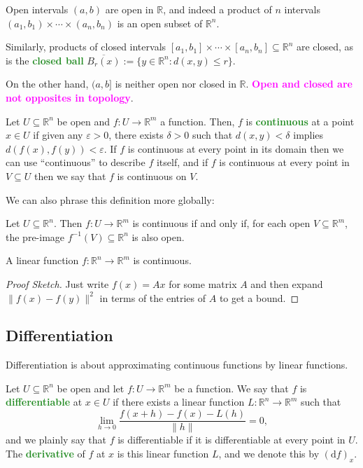 \documentclass[10pt]{scrartcl}
\providecommand{\ol}{\overline}
\providecommand{\eps}{\varepsilon}
\providecommand{\RR}{\mathbb R}
\providecommand{\alert}[1]{{\sffamily\textbf{\textcolor{magenta}{#1}}}}
\providecommand{\inv}{^{-1}}
\providecommand{\vocab}[1]{{\textbf{\textcolor{ForestGreen}{#1}}}}
\begin{document}
\begin{example}
	Open intervals $(a,b)$ are open in $\RR$,
	and indeed a product of $n$ intervals
	$(a_1, b_1)\times\cdots\times(a_n,b_n)$
	is an open subset of $\RR^n$.
	
	Similarly, products of closed intervals
	$[a_1, b_1]\times\cdots\times[a_n,b_n]\subseteq\RR^n$
	are closed, as is the \vocab{closed ball}
	$\ol{B_r(x)} := \{y\in\RR^n:d(x,y)\le r\}$.
	
	On the other hand, $(a,b]$ is neither open nor closed in $\RR$.
	\alert{Open and closed are not opposites in topology}.
\end{example}

\begin{definition}[Continuity]
	Let $U\subseteq\RR^n$ be open and $f\colon U\to\RR^m$ a function.
	Then, $f$ is \vocab{continuous} at a point $x\in U$ if
	given any $\eps > 0$, there exists $\delta > 0$ such that
	$d(x,y)<\delta$ implies $d(f(x),f(y)) < \eps$.
	If $f$ is continuous at every point in its domain
	then we can use ``continuous'' to describe $f$ itself,
	and if $f$ is continuous at every point in $V\subseteq U$
	then we say that $f$ is continuous on $V$.
\end{definition}

We can also phrase this definition more globally:
\begin{prop}
	Let $U\subseteq\RR^n$. Then $f\colon U\to\RR^m$ is continuous
	if and only if, for each open $V\subseteq\RR^m$, the pre-image
	$f\inv(V)\subseteq\RR^n$ is also open.
\end{prop}

\begin{prop}
	A linear function $f\colon\RR^n\to\RR^m$ is continuous.
\end{prop}

\begin{proof}[Proof Sketch]
	Just write $f(x) = Ax$ for some matrix $A$
	and then expand $\|f(x) - f(y)\|^2$ in terms of the entries of $A$
	to get a bound.
\end{proof}

\subsection{Differentiation}
Differentiation is about approximating
continuous functions by linear functions.

\begin{definition}
	Let $U\subseteq\RR^n$ be open and let $f\colon U\to\RR^m$ be a function.
	We say that $f$ is \vocab{differentiable} at $x\in U$ if
	there exists a linear function $L\colon\RR^n\to\RR^m$ such that
	\[\lim_{h\to 0} \frac{f(x+h) - f(x) - L(h)}{\|h\|} = 0,\]
	and we plainly say that $f$ is differentiable if it
	is differentiable at every point in $U$.
	The \vocab{derivative} of $f$ at $x$ is this linear function $L$,
	and we denote this by $(\mathrm df)_x$.
\end{definition}
\end{document}
